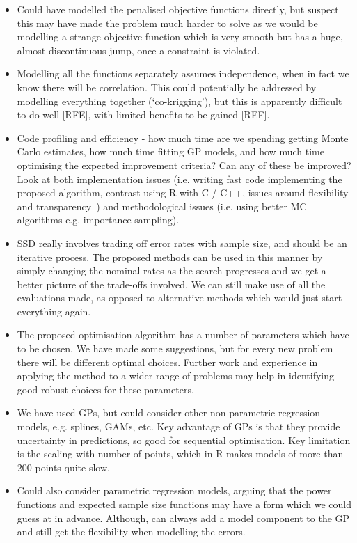 \documentclass{article} %
\begin{document}
\begin{itemize}
\item Could have modelled the penalised objective functions directly, but suspect this may have made the problem much harder to solve as we would be modelling a strange objective function which is very smooth but has a huge, almost discontinuous jump, once a constraint is violated.
\item Modelling all the functions separately assumes independence, when in fact we know there will be correlation. This could potentially be addressed by modelling everything together (`co-krigging'), but this is apparently difficult to do well [RFE], with limited benefits to be gained [REF].
\item Code profiling and efficiency - how much time are we spending getting Monte Carlo estimates, how much time fitting GP models, and how much time optimising the expected improvement criteria? Can any of these be improved? Look at both implementation issues (i.e. writing fast code implementing the proposed algorithm, contrast using R with C / C++, issues around flexibility and transparency~\cite{Smith2010}) and methodological issues (i.e. using better MC algorithms e.g. importance sampling).
\item SSD really involves trading off error rates with sample size, and should be an iterative process. The proposed methods can be used in this manner by simply changing the nominal rates as the search progresses and we get a better picture of the trade-offs involved. We can still make use of all the evaluations made, as opposed to alternative methods which would just start everything again.
\item The proposed optimisation algorithm has a number of parameters which have to be chosen. We have made some suggestions, but for every new problem there will be different optimal choices. Further work and experience in applying the method to a wider range of problems may help in identifying good robust choices for these parameters.
\item We have used GPs, but could consider other non-parametric regression models, e.g. splines, GAMs, etc. Key advantage of GPs is that they provide uncertainty in predictions, so good for sequential optimisation. Key limitation is the scaling with number of points, which in R makes models of more than 200 points quite slow.
\item Could also consider parametric regression models, arguing that the power functions and expected sample size functions may have a form which we could guess at in advance. Although, can always add a model component to the GP and still get the flexibility when modelling the errors.

\end{itemize}
\end{document}
